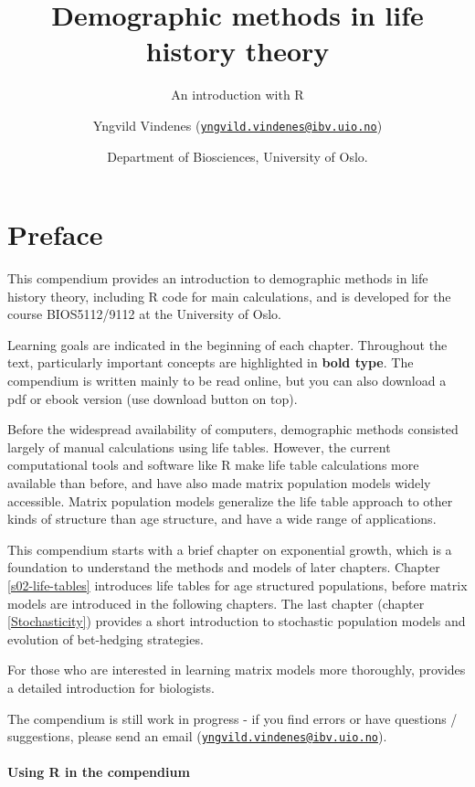 \documentclass[
]{book}
\title{Demographic methods in life history theory}
\subtitle{An introduction with R}
\author{Yngvild Vindenes (\href{mailto:yngvild.vindenes@ibv.uio.no}{\nolinkurl{yngvild.vindenes@ibv.uio.no}})}
\date{Department of Biosciences, University of Oslo.}
\begin{document}
\maketitle

{
\setcounter{tocdepth}{1}
\tableofcontents
}
\hypertarget{preface}{%
\chapter*{Preface}\label{preface}}

This compendium provides an introduction to demographic methods in life history theory, including R code for main calculations, and is developed for the course BIOS5112/9112 at the University of Oslo.

Learning goals are indicated in the beginning of each chapter. Throughout the text, particularly important concepts are highlighted in \textbf{bold type}. The compendium is written mainly to be read online, but you can also download a pdf or ebook version (use download button on top).

Before the widespread availability of computers, demographic methods consisted largely of manual calculations using life tables. However, the current computational tools and software like R \citep{R} make life table calculations more available than before, and have also made matrix population models widely accessible. Matrix population models generalize the life table approach to other kinds of structure than age structure, and have a wide range of applications.

This compendium starts with a brief chapter on exponential growth, which is a foundation to understand the methods and models of later chapters. Chapter \ref{s02-life-tables} introduces life tables for age structured populations, before matrix models are introduced in the following chapters. The last chapter (chapter \ref{Stochasticity}) provides a short introduction to stochastic population models and evolution of bet-hedging strategies.

For those who are interested in learning matrix models more thoroughly, \citet{Caswell1} provides a detailed introduction for biologists.

The compendium is still work in progress - if you find errors or have questions / suggestions, please send an email (\href{mailto:yngvild.vindenes@ibv.uio.no}{\nolinkurl{yngvild.vindenes@ibv.uio.no}}).

\hypertarget{using-r-in-the-compendium}{%
\subsubsection*{Using R in the compendium}\label{using-r-in-the-compendium}}
\end{document}
